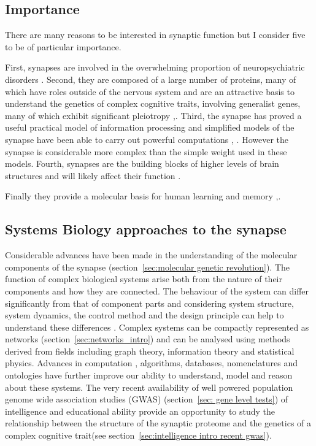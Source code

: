 \subsection{Importance}
There are many reasons to be interested in synaptic function but I consider five to be of particular importance. 

First, synapses are involved in the overwhelming proportion of neuropsychiatric disorders \cite{grant2012synaptopathies}.  Second, they are composed of a large number of proteins, many of which have roles outside of the nervous system and are an attractive basis to understand the genetics of complex cognitive traits, involving generalist genes, many of which exhibit significant pleiotropy \cite{sharma2000induction},\cite{plomin2015genetics}. Third, the synapse has proved a useful practical model of information processing and simplified models of the synapse have been able to carry out powerful computations \cite{hinton2007learning}, \cite{dean2012three}. However the synapse is considerable more complex than the simple weight used in these models. Fourth, synapses are the building blocks of higher levels of brain structures \cite{armstrong2012evolution} and will likely affect their function \cite{dean2012three}.

Finally they provide a molecular basis for human learning and memory \cite{kandel2014molecular},\cite{gallistel2013neuroscience}.



      




 

\subsection{Systems Biology approaches to the synapse}
Considerable advances have been made in the understanding of the molecular components of the synapse (section~\ref{sec:molecular genetic revolution}). The function of complex biological systems arise both from the nature of their components and how they are connected\cite{kitano2002systems}. The behaviour of the system can differ significantly from that of component parts and considering system structure, system dynamics, the control method and the design principle can help to understand these differences \cite{kitano2002systems}. Complex systems can be compactly represented as networks (section~\ref{sec:networks_intro}) and can be analysed using methods derived from fields including graph theory, information theory and statistical physics\cite{newman2018networks}. Advances in computation \cite{nobile2017graphics}, algorithms, databases, nomenclatures \cite{ito2014systematic} and ontologies \cite{smith2007obo} have further improve our ability to understand, model and reason about these systems. The very recent availability of well powered population genome wide association studies (GWAS) (section~\ref{sec: gene level tests}) of intelligence and educational ability provide an opportunity to study the relationship between the structure of the synaptic proteome and the genetics of a complex cognitive trait(see section~\ref{sec:intelligence intro recent gwas}).
 
